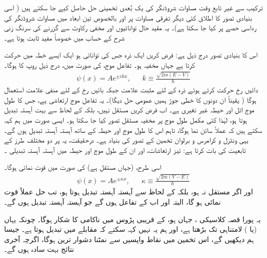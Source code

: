   ترکیب سے غیر تابع وقت مساوات شروڈنگر کی یک بُعدی تخمینی حل حاصل کیے جا سکتے ہیں ( اسی بنیادی تصور کا اطلاق کئی دیگر تفرقی مساوات پر اور بالخصوص تین ابعاد میں مساوات شروڈنگر کی رداسی حصے پر کیا جا سکتا ہے)۔ یہ  مقید حال توانائیوں اور مخفی رکاوٹ سے گزرنے کی سرنگ زنی شرح کے حساب میں خصوصاً  مفید ثابت ہوتا ہے۔

اس کا بنیادی تصور درج ذیل ہے: فرض کریں ایک ذرہ جس کی توانائی  ہو ایک ایسے خطہ میں حرکت کرتا ہے جہاں مخفیہ    ہو۔ تفاعل موج،   کی صورت میں،  درج ذیل روپ کا  ہوگا۔
\begin{align*}
	\psi(x)=Ae^{\pm ikx}, && k\equiv\frac{\sqrt{2m(E-V)}}{\hslash} 
\end{align*}
دائیں رخ حرکت کرتے ہوئے ذرہ  کے لئے مثبت علامت جبکہ بائیں رخ کے لئے منفی علامت استعمال ہوگا ( یقیناً ان دونوں کا خطی جوڑ ہمیں  عمومی حل دیگا)۔ یہ تفاعل موج ارتعاشی ہے،  جس کا طول موج  اٹل  اور  حیطہ  غیر تغیری  ہے۔ اب فرض کریں   مستقل نہیں،   بلکہ  کے لحاظ سے بہت آہستہ تبدیل ہوتا ہو،  لہٰذا  کئی  مکمل  طول موج پر مخفیہ  مستقل تصور کیا جا سکتا ہو۔ ایسی صورت میں ہم کہہ سکتے ہیں کہ  عملاً سائن نما ہوگا،  تاہم اس کا طول موج اور حیطہ  کے ساتھ  آہستہ آہستہ تبدیل ہوں گے۔ یہی  ونٹزل  و کرامرس  و برلوان تخمین   کے تصور  کی بنیاد ہے۔ درحقیقت،  یہ  پر دو مختلف طرز کے تابعیت کی بات کرتا ہے: تیز    ارتعاشات،    اور ان کے   طول موج اور حیطہ میں   آہستہ آہستہ   تبدیلی   ۔

اسی طرح،    (جہاں  مستقل ہے)  کی صورت میں  قوت نمائی ہوگا۔
\begin{align*}
	\psi(x)=Ae^{\pm\kappa x},&& \kappa \equiv\frac{\sqrt{2m(V-E)}}{\hslash} 
\end{align*}
اور اگر   مستقل نہ ہو،  بلکہ  کے لحاظ سے آہستہ آہستہ تبدیل ہوتا ہو، تب حل عملاً قوت نمائی ہو گا،  البتہ  اور  اب  کے تفاعل ہوں گے جو  آہستہ آہستہ تبدیل   ہوں گے۔ 

یہ  پورا قصہ  کلاسیکی ، جہاں  ہو،  کے   قریبی پڑوس میں ناکامی کا شکار ہوگا۔  چونکہ  یہاں  (یا )  لامتناہی تک بڑھتا ہے،  اور ہم یہ نہیں کہہ سکتے  کہ  مقابلے   میں   تبدیل ہوتا ہے۔ جیسا ہم  دیکھیں گے،  اس تخمین میں نقاط واپسیں  سے نمٹنا دشوار ترین  ہوگا،  اگرچہ آخری نتائج  بہت سادہ ہوں گے۔

